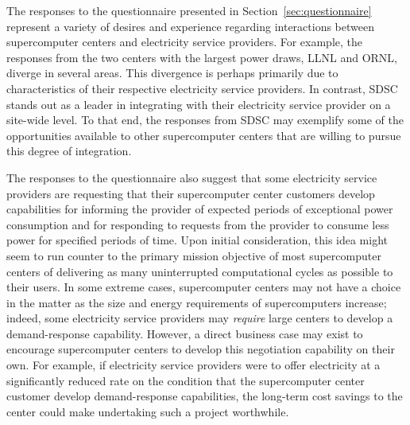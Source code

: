 The responses to the questionnaire presented in
Section~\ref{sec:questionnaire} represent a variety of desires and
experience regarding interactions between supercomputer centers and
electricity service providers.  For example, the responses from the two centers
with the largest power draws, LLNL and ORNL, diverge in several
areas.  This divergence is perhaps primarily due to characteristics of
their respective electricity service providers.  In contrast, SDSC stands out as a leader in integrating
with their electricity service provider on a site-wide level.  To that end, the
responses from SDSC may exemplify some of the opportunities available
to other supercomputer centers that are willing to pursue this degree
of integration.

The responses to the questionnaire also suggest that some electricity service
providers are requesting that their supercomputer center customers
develop capabilities for informing the provider of expected periods of
exceptional power consumption and for responding to requests from the
provider to consume less power for specified periods of time.  Upon
initial consideration, this idea might seem to run counter to the
primary mission objective of most supercomputer centers of delivering
as many uninterrupted computational cycles as possible to their users.
In some extreme cases, supercomputer centers may not have a choice
in the matter as the size and energy requirements of supercomputers
increase; indeed, some electricity service providers may \textit{require} large
centers to develop a demand-response capability.  However, a direct
business case may exist to encourage supercomputer centers to develop
this negotiation capability on their own.  For example, if electricity service
providers were to offer electricity at a significantly reduced rate
on the condition that the supercomputer center customer develop
demand-response capabilities, the long-term cost savings to the
center could make undertaking such a project worthwhile.

